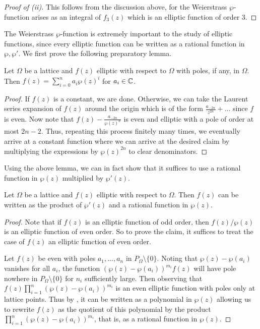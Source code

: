\begin{proof}[Proof of (ii)]
    This follows from the discussion above, for the Weierstrass $\wp$-function arises as an integral of $f_{3}(z)$ which is an elliptic function of order 3. 
\end{proof}
The Weierstrass $\wp$-function is extremely important to the study of elliptic functions, since every elliptic function can be written as a rational function in $\wp,\wp'$. We first prove the following preparatory lemma. 
\begin{lemma}\label{lem: ellitpic function with poles only in lattice is polynomial in Weierstrass}
    Let $\Omega$ be a lattice and $f(z)$ elliptic with respect to $\Omega$ with poles, if any, in $\Omega$. Then $f(z)=\sum_{i=0}^{n}a_{i}\wp(z)^{i}$ for $a_{i}\in\mathbb{C}$. 
\end{lemma}
\begin{proof}
    If $f(z)$ is a constant, we are done. Otherwise, we can take the Laurent series expansion of $f(z)$ around the origin which is of the form $\frac{a_{-2n}}{z^{2n}}+\dots$ since $f$ is even. Now note that $f(z)-\frac{a_{-2n}}{\wp(z)^{n}}$ is even and elliptic with a pole of order at most $2n-2$. Thus, repeating this process finitely many times, we eventually arrive at a constant function where we can arrive at the desired claim by multiplying the expressions by $\wp(z)^{2n}$ to clear denominators.  
\end{proof}
Using the above lemma, we can in fact show that it suffices to use a rational function in $\wp(z)$ multiplied by $\wp'(z)$. 
\begin{proposition}\label{prop: elliptic functions in terms of Weierstrass}
    Let $\Omega$ be a lattice and $f(z)$ elliptic with respect to $\Omega$. Then $f(z)$ can be written as the product of $\wp'(z)$ and a rational function in $\wp(z)$.  
\end{proposition}
\begin{proof}
    Note that if $f(z)$ is an elliptic function of odd order, then $f(z)/\wp(z)$ is an elliptic function of even order. So to prove the claim, it suffices to treat the case of $f(z)$ an elliptic function of even order. 

    Let $f(z)$ be even with poles $a_{1},\dots,a_{n}$ in $P_{\Omega}\setminus\{0\}$. Noting that $\wp(z)-\wp(a_{i})$ vanishes for all $a_{i}$, the function $(\wp(z)-\wp(a_{i}))^{m_{i}}f(z)$ will have pole nowhere in $P_{\Omega}\setminus\{0\}$ for $n_{i}$ sufficiently large. Then observing that $f(z)\prod_{i=1}^{n}(\wp(z)-\wp(a_{i}))^{m_{i}}$ is an even elliptic function with poles only at lattice points. Thus by , it can be written as a polynomial in $\wp(z)$ allowing us to rewrite $f(z)$ as the quotient of this polynomial by the product $\prod_{i=1}^{n}(\wp(z)-\wp(a_{i}))^{m_{i}}$, that is, as a rational function in $\wp(z)$. 
\end{proof}
